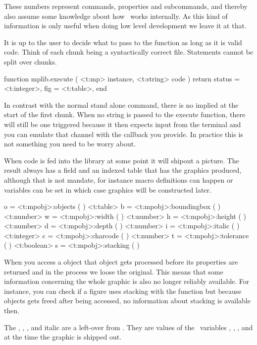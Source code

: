These numbers represent commands, properties and subcommands, and thereby also
assume some knowledge about how \METAPOST\ works internally. As this kind of
information is only useful when doing low level development we leave it at that.

\stopsection

\startsection[title=Processing]

It is up to the user to decide what to pass to the  function as
long as it is valid code. Think of each chunk being a syntactically correct file.
Statements cannot be split over chunks.

\starttyping[option=LUA]
function mplib.execute ( <t:mp> instance, <t:string> code )
    return {
        status = <t:integer>,
        fig    = <t:table>,
    }
end
\stoptyping

In contrast with the normal stand alone  command, there is no
implied  at the start of the first chunk. When no string is passed
to the execute function, there will still be one triggered because it then
expects input from the terminal and you can emulate that channel with the
callback you provide. In practice this is not something you need to be worry
about.

When code is fed into the library at some point it will shipout a picture. The
result always has a  field and an indexed  table that
has the graphics produced, although that is not mandate, for instance macro
definitions can happen or variables can be set in which case graphics will be
constructed later.

 o = <t:mpobj>:objects     ( )
<t:table>    b = <t:mpobj>:boundingbox ( )
<t:number>   w = <t:mpobj>:width       ( )
<t:number>   h = <t:mpobj>:height      ( )
<t:number>   d = <t:mpobj>:depth       ( )
<t:number>   i = <t:mpobj>:italic      ( )
<t:integer>  c = <t:mpobj>:charcode    ( )
<t:number>   t = <t:mpobj>:tolerance   ( )
<t:boolean>  s = <t:mpobj>:stacking    ( )
\stoptyping

When you access a object that object gets processed before its properties are
returned and in the process we loose the original. This means that some
information concerning the whole graphic is also no longer reliably available.
For instance, you can check if a figure uses stacking with the 
function but because objects gets freed after being accessed, no information
about stacking is available then.

The , , ,  and \type
{italic} are a left-over from \METAFONT. They are values of the \METAPOST\
variables , , \typ
[option=MP] {fontcharht}, \typ [option=MP] {fontchardp} and \typ [option=MP]
{fontcharit} at the time the graphic is shipped out.

